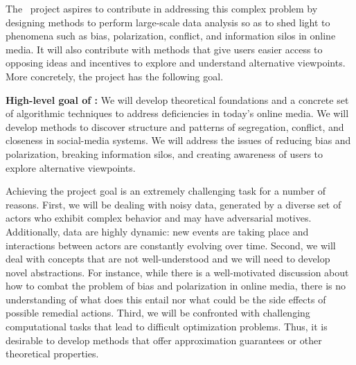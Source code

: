 \documentclass[a4paper,11pt]{article}
\begin{document}
\smallskip
The \acronym\ project aspires to contribute in addressing this complex problem
by designing methods to perform large-scale data analysis so as to shed light to 
phenomena such as bias, polarization, conflict, and 
information silos in online media. 
It will also contribute with methods
that give users easier access to opposing ideas
and incentives to explore and understand alternative view\-points. 
More concretely, the project has the following goal.

\medskip
\noindent
\hspace{-3mm}\colorbox{verylightmagenta}{
\begin{minipage}{\textwidth}
{\bf High-level goal of \acronym:} 
We will develop theoretical foundations and a concrete set of algorithmic techniques 
to address deficiencies in today's online media.
We will develop methods to discover structure and patterns 
of segregation, conflict, and closeness in social-media systems.
We will address the issues of 
reducing bias and po\-lar\-iza\-tion, breaking information silos,
and creating awareness of users to explore alternative view\-points.
\end{minipage}}

Achieving the project goal is an extremely challenging task for a number of reasons. 
First, we will be dealing with noisy data, 
generated by a diverse set of actors
who exhibit complex behavior and may have adversarial motives.
Additionally, data are highly dynamic:
new events are taking place and inter\-actions between actors 
are constantly evolving over time. 
Second, we will deal with concepts that are not well-understood 
and we will need to develop novel abstractions. %
For instance, 
while there is a well-motivated discussion 
about how to combat the problem of bias and polarization in online media, 
there is no understanding of what does this entail %
nor what could be the side effects of possible remedial actions.
Third, we will be confronted with challenging computational tasks 
that lead to difficult optimization problems. 
Thus, it is desirable to develop methods 
that offer approximation guarantees or other theoretical properties. 

\iffalse
\spara{Methodological approach.}
We will pursue the project goal by
following a methodology that aims to tackle the challenges outlined above.
(1)~We will develop abstractions that capture the semantics of the application domain
and we will provide formal problem definitions that capture our objectives.
(2)~We will develop and work with theoretical frameworks that capture the noise and complexity 
of real-world data. 
(3)~We will develop scalable algorithms with theoretical guarantees on the solution quality. 
\fi
\end{document}

